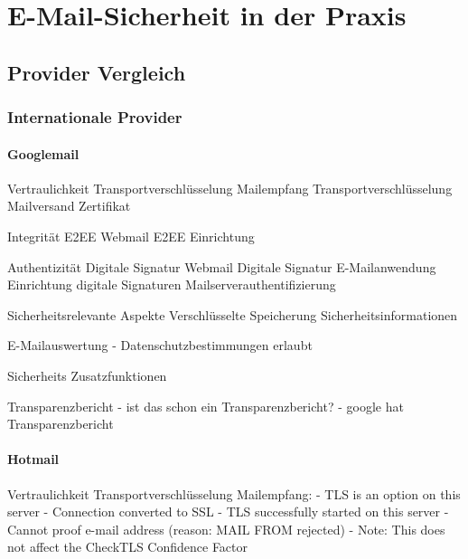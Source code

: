 \documentclass  [paper=a4,
				fontsize=12pt,
				listof=totoc,
				bibliography=totoc
				]{scrreprt}
\begin{document}
	\chapter{E-Mail-Sicherheit in der Praxis}
		\section{Provider Vergleich}
			\subsection{Internationale Provider}
			
			
			
			
			
			\subsubsection*{Googlemail}
			\label{subsubsec:googlemail}
			Vertraulichkeit
			Transportverschlüsselung Mailempfang
			Transportverschlüsselung Mailversand
			Zertifikat
			
			Integrität
			E2EE Webmail
			E2EE Einrichtung
			
			Authentizität
			Digitale Signatur Webmail
			Digitale Signatur E-Mailanwendung
			Einrichtung digitale Signaturen
			Mailserverauthentifizierung
			
			Sicherheitsrelevante Aspekte
			Verschlüsselte Speicherung
			Sicherheitsinformationen
			
			E-Mailauswertung
			- Datenschutzbestimmungen erlaubt
			
			Sicherheits Zusatzfunktionen
			
			Transparenzbericht
			- ist das schon ein Transparenzbericht?
			- google hat Transparenzbericht
			
			
			
			\subsubsection*{Hotmail}
			\label{subsubsec:googlemail}
			
			Vertraulichkeit
			Transportverschlüsselung Mailempfang:
			-  	TLS is an option on this server
			-  	Connection converted to SSL
			- 	TLS successfully started on this server
			- 	Cannot proof e-mail address (reason: MAIL FROM rejected)
			- Note: This does not affect the CheckTLS Confidence Factor
			
\end{document}
